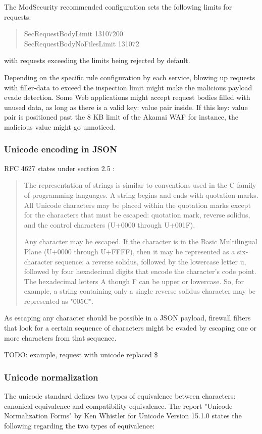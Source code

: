The ModSecurity recommended configuration sets the following limits for requests:
\begin{quote}
	SecRequestBodyLimit 13107200 \\
	SecRequestBodyNoFilesLimit 131072
\end{quote}
with requests exceeding the limits being rejected by default. \cite{modsec/recconf}

Depending on the specific rule configuration by each service, blowing up requests with filler-data to exceed the inspection limit might make the malicious payload evade detection. Some Web applications might accept request bodies filled with unused data, as long as there is a valid key: value pair inside. If this key: value pair is positioned past the 8 KB limit of the Akamai WAF for instance, the malicious value might go unnoticed.


\subsubsection{Unicode encoding in JSON}
RFC 4627  states under section 2.5 :
\begin{quote}
	The representation of strings is similar to conventions used in the C
	family of programming languages.  A string begins and ends with
	quotation marks.  All Unicode characters may be placed within the
	quotation marks except for the characters that must be escaped:
	quotation mark, reverse solidus, and the control characters (U+0000
	through U+001F).

	Any character may be escaped.  If the character is in the Basic
	Multilingual Plane (U+0000 through U+FFFF), then it may be
	represented as a six-character sequence: a reverse solidus, followed
	by the lowercase letter u, followed by four hexadecimal digits that
	encode the character's code point.  The hexadecimal letters A though
	F can be upper or lowercase.  So, for example, a string containing
	only a single reverse solidus character may be represented as
	"\u005C". \cite{rfc4627}
\end{quote}
As escaping any character should be possible in a JSON payload, firewall filters that look for a certain sequence of characters might be evaded by escaping one or more characters from that sequence.

	{\color{red} TODO: example, request with unicode replaced \$ }


\subsubsection{Unicode normalization}
\label{sec:unicodenormalization}
The unicode standard defines two types of equivalence between characters: canonical equivalence and compatibility equivalence. The report "Unicode Normalization Forms" by Ken Whistler for Unicode Version 15.1.0 states the following regarding the two types of equivalence:

